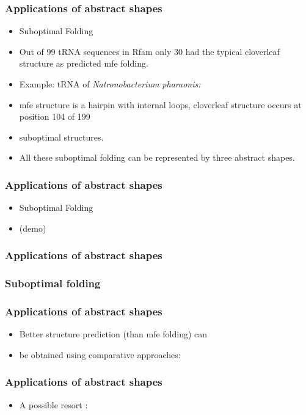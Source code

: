 \documentclass[ignorenonframetext,10pt]{beamer}
\begin{document}
\begin{frame}
\frametitle{Applications of abstract shapes}
   \begin{itemize} 
   \item Suboptimal Folding
   \item Out of 99 tRNA sequences in Rfam only 30 had the typical cloverleaf structure as predicted mfe folding.
   \item Example: tRNA of  \emph{Natronobacterium pharaonis:}
   \item  \emph{    }mfe structure is a hairpin with internal loops, cloverleaf structure occurs at position 104 of 199 
   \item     suboptimal structures.
   \item All these suboptimal folding can be represented by three abstract shapes.
   \end{itemize}
\end{frame}

\begin{frame}
\frametitle{Applications of abstract shapes}
   \begin{itemize} 
   \item Suboptimal Folding
   \item (demo)
   \end{itemize}
\end{frame}

\begin{frame}
\frametitle{Applications of abstract shapes}
\end{frame}

\begin{frame}
\frametitle{Suboptimal folding}
\end{frame}

\begin{frame}
\frametitle{Applications of abstract shapes}
   \begin{itemize} 
   \item Better structure prediction (than mfe folding) can
   \item be obtained using comparative approaches:
   \end{itemize}
\end{frame}

\begin{frame}
\frametitle{Applications of abstract shapes}
   \begin{itemize} 
   \item A possible resort : 
   \end{itemize}
\end{frame}
\end{document}
